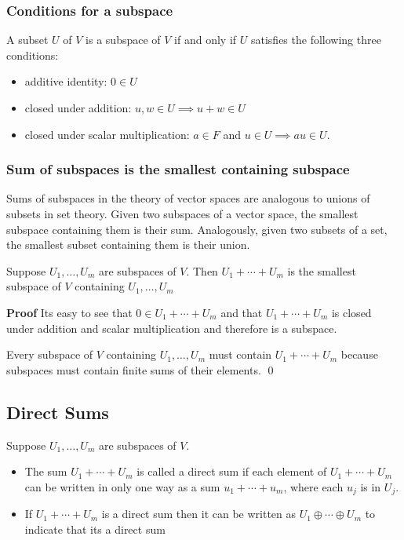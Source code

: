 \subsubsection{Conditions for a subspace}
A subset $U$ of $V$ is a subspace of $V$ if and only if $U$ satisfies the following three conditions:

\begin{itemize}
  \item additive identity: $0 \in U$
  \item closed under addition: $u, w \in U \implies u+w\in U$
  \item closed under scalar multiplication: $a \in F$ and  $u \in U \implies au \in U$.
\end{itemize}

\subsubsection{Sum of subspaces is the smallest containing subspace}
Sums of subspaces in the theory of vector spaces are analogous to unions of subsets in set theory. Given two subspaces of a vector space, the smallest subspace containing them is their sum. Analogously, given two subsets of a set, the smallest subset containing them is their union.

Suppose $U_1, \dots, U_m$ are subspaces of $V$. Then $U_1 + \cdots + U_m$ is the smallest subspace of $V$ containing $U_1, \dots, U_m$

\textbf{Proof} Its easy to see that $0 \in U_1 + \cdots + U_m$ and that $U_1 + \cdots + U_m$ is closed under addition and scalar multiplication and therefore is a subspace.

Every subspace of $V$ containing $U_1, \dots, U_m$ must contain $U_1 + \cdots + U_m$ because subspaces must contain finite sums of their elements. \qed

\subsection{Direct Sums}
Suppose $U_1, \dots, U_m$ are subspaces of $V$.
\begin{itemize}
  \item The sum $U_1 + \cdots + U_m$ is called a direct sum if each element of $U_1 + \cdots + U_m$ can be written in only one way as a sum $u_1 + \cdots + u_m$, where each $u_j$ is in $U_j$.
  \item If $U_1 + \cdots + U_m$ is a direct sum then it can be written as $U_1 \oplus \cdots \oplus  U_m$ to indicate that its a direct sum
\end{itemize}

